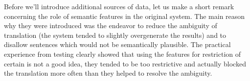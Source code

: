 \documentclass[letterpaper]{article}
\begin{document}



Before we'll introduce additional sources of data, let us make a short remark concerning the role of semantic features in the original system. The main reason why they were introduced was the endeavor to reduce the ambiguity of translation (the system tended to slightly overgenerate the results) and to disallow sentences which would not be semantically plausible. The practical experience from testing clearly showed that using the features for restriction of certain is not a good idea, they tended to be too restrictive and actually blocked the translation more often than they helped to resolve the ambiguity.
\end{document}
